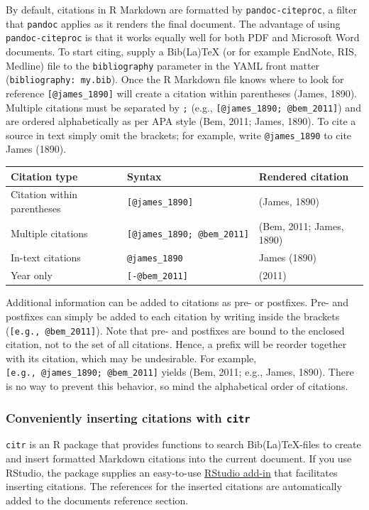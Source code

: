 \documentclass[man,floatsintext]{apa6}
\theoremstyle{definition}
\theoremstyle{definition}
\theoremstyle{definition}
\theoremstyle{remark}
\begin{document}
By default, citations in R Markdown are formatted by
\texttt{pandoc-citeproc}, a filter that \texttt{pandoc} applies as it
renders the final document. The advantage of using
\texttt{pandoc-citeproc} is that it works equally well for both PDF and
Microsoft Word documents. To start citing, supply a Bib(La)TeX (or for
example EndNote, RIS, Medline) file to the \texttt{bibliography}
parameter in the YAML front matter (\texttt{bibliography:\ my.bib}).
Once the R Markdown file knows where to look for reference
\texttt{{[}@james\_1890{]}} will create a citation within parentheses
(James, 1890). Multiple citations must be separated by \texttt{;} (e.g.,
\texttt{{[}@james\_1890;\ @bem\_2011{]}}) and are ordered alphabetically
as per APA style (Bem, 2011; James, 1890). To cite a source in text
simply omit the brackets; for example, write \texttt{@james\_1890} to
cite James (1890).

\begin{longtable}[]{@{}lll@{}}
\toprule
Citation type & Syntax & Rendered citation\tabularnewline
\midrule
\endhead
Citation within parentheses & \texttt{{[}@james\_1890{]}} & (James,
1890)\tabularnewline
Multiple citations & \texttt{{[}@james\_1890;\ @bem\_2011{]}} & (Bem,
2011; James, 1890)\tabularnewline
In-text citations & \texttt{@james\_1890} & James (1890)\tabularnewline
Year only & \texttt{{[}-@bem\_2011{]}} & (2011)\tabularnewline
\bottomrule
\end{longtable}

Additional information can be added to citations as pre- or postfixes.
Pre- and postfixes can simply be added to each citation by writing
inside the brackets (\texttt{{[}e.g.,\ @bem\_2011{]}}). Note that pre-
and postfixes are bound to the enclosed citation, not to the set of all
citations. Hence, a prefix will be reorder together with its citation,
which may be undesirable. For example,
\texttt{{[}e.g.,\ @james\_1890;\ @bem\_2011{]}} yields (Bem, 2011; e.g.,
James, 1890). There is no way to prevent this behavior, so mind the
alphabetical order of citations.

\subsubsection{\texorpdfstring{Conveniently inserting citations with
\texttt{citr}}{Conveniently inserting citations with citr}}\label{conveniently-inserting-citations-with-citr}

\texttt{citr} is an R package that provides functions to search
Bib(La)TeX-files to create and insert formatted Markdown citations into
the current document. If you use RStudio, the package supplies an
easy-to-use \href{https://rstudio.github.io/rstudioaddins/}{RStudio
add-in} that facilitates inserting citations. The references for the
inserted citations are automatically added to the documents reference
section.
\end{document}
